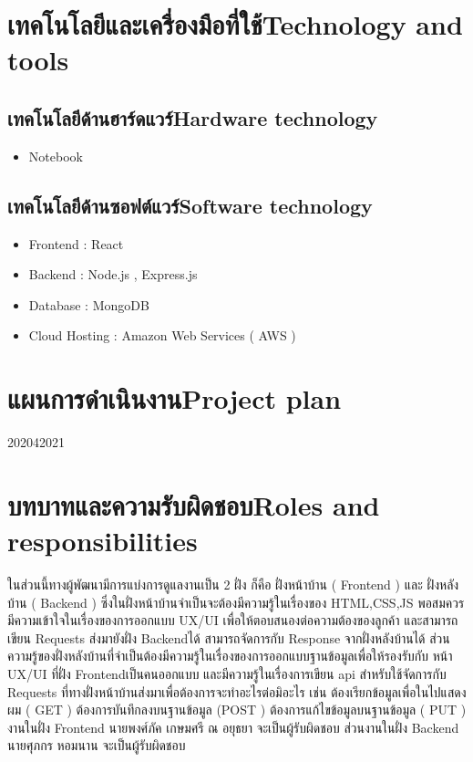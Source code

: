 \section{\ifcpe เทคโนโลยีและเครื่องมือที่ใช้\else Technology and tools\fi}

\subsection{\ifcpe เทคโนโลยีด้านฮาร์ดแวร์\else Hardware technology\fi}
\begin{itemize}
    \item Notebook
\end{itemize}

\subsection{\ifcpe เทคโนโลยีด้านซอฟต์แวร์\else Software technology\fi}
\begin{itemize}
    \item Frontend : React 	
    \item Backend : Node.js , Express.js 
    \item Database : MongoDB
    \item Cloud Hosting : Amazon Web Services ( AWS )
\end{itemize}



\section{\ifcpe แผนการดำเนินงาน\else Project plan\fi}

\begin{plan}{6}{2020}{4}{2021}

\end{plan}


\section{\ifcpe บทบาทและความรับผิดชอบ\else Roles and responsibilities\fi}
ในส่วนนี้ทางผู้พัฒนามีการแบ่งการดูแลงานเป็น 2 ฝั่ง ก็คือ ฝั่งหน้าบ้าน 
( Frontend ) และ ฝั่งหลังบ้าน ( Backend ) ซึ่งในฝั่งหน้าบ้านจำเป็นจะต้องมีความรู้ในเรื่องของ HTML,CSS,JS พอสมควร มีความเข้าใจในเรื่องของการออกแบบ UX/UI เพื่อให้ตอบสนองต่อความต้องของลูกค้า และสามารถเขียน Requests ส่งมายังฝั่ง Backendได้ สามารถจัดการกับ Response จากฝั่งหลังบ้านได้ ส่วนความรู้ของฝั่งหลังบ้านที่จำเป็นต้องมีความรู้ในเรื่องของการออกแบบฐานข้อมูลเพื่อให้รองรับกับ หน้า UX/UI ที่ฝั่ง Frontendเป็นคนออกแบบ และมีความรู้ในเรื่องการเขียน api สำหรับใช้จัดการกับ Requests ที่ทางฝั่งหน้าบ้านส่งมาเพื่อต้องการจะทำอะไรต่อมิอะไร เช่น ต้องเรียกข้อมูลเพื่อในไปแสดงผม ( GET )
ต้องการบันทึกลงบนฐานข้อมูล (POST ) ต้องการแก้ไขข้อมูลบนฐานข้อมูล ( PUT )
งานในฝั่ง Frontend นายพงศ์ภัค เกษมศรี ณ อยุธยา จะเป็นผู้รับผิดชอบ 
ส่วนงานในฝั่ง Backend นายศุภกร หอมนาน  จะเป็นผู้รับผิดชอบ



